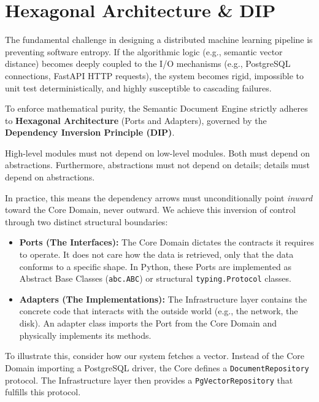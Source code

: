 \section{Hexagonal Architecture \& DIP}

The fundamental challenge in designing a distributed machine learning pipeline is preventing software entropy. If the algorithmic logic (e.g., semantic vector distance) becomes deeply coupled to the I/O mechanisms (e.g., PostgreSQL connections, FastAPI HTTP requests), the system becomes rigid, impossible to unit test deterministically, and highly susceptible to cascading failures.

To enforce mathematical purity, the Semantic Document Engine strictly adheres to \textbf{Hexagonal Architecture} (Ports and Adapters), governed by the \textbf{Dependency Inversion Principle (DIP)}.

\begin{semanticpanel}
High-level modules must not depend on low-level modules. Both must depend on abstractions. Furthermore, abstractions must not depend on details; details must depend on abstractions.
\end{semanticpanel}


In practice, this means the dependency arrows must unconditionally point \textit{inward} toward the Core Domain, never outward. We achieve this inversion of control through two distinct structural boundaries:

\begin{itemize}
    \item \textbf{Ports (The Interfaces):} The Core Domain dictates the contracts it requires to operate. It does not care how the data is retrieved, only that the data conforms to a specific shape. In Python, these Ports are implemented as Abstract Base Classes (\texttt{abc.ABC}) or structural \texttt{typing.Protocol} classes.
    \item \textbf{Adapters (The Implementations):} The Infrastructure layer contains the concrete code that interacts with the outside world (e.g., the network, the disk). An adapter class imports the Port from the Core Domain and physically implements its methods.
\end{itemize}

To illustrate this, consider how our system fetches a vector. Instead of the Core Domain importing a PostgreSQL driver, the Core defines a \texttt{DocumentRepository} protocol. The Infrastructure layer then provides a \texttt{PgVectorRepository} that fulfills this protocol.

